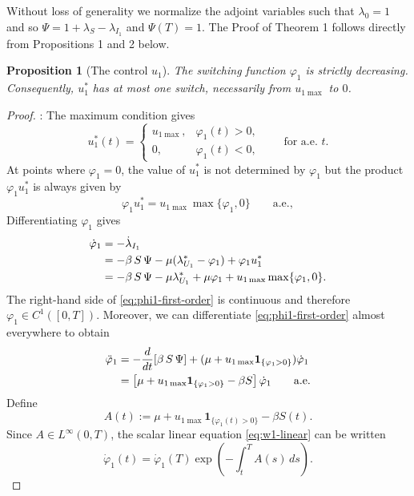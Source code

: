 \documentclass[pdflatex]{sn-jnl}
\newtheorem{proposition}{Proposition}
\theoremstyle{thmstyleone}%
\theoremstyle{thmstyletwo}%
\theoremstyle{thmstylethree}%
\begin{document}
Without loss of generality we normalize the adjoint variables such that $\lambda_0=1$ and so $\Psi=1+\lambda_S-\lambda_{I_1}$ and $\Psi(T)=1$. The Proof of Theorem 1 follows directly from Propositions 1 and 2 below.
%
\begin{proposition}[The control $u_1$]
\label{prop:u1-one-switch}
The switching function \(\varphi_1\) is strictly decreasing. Consequently,
\(u_1^*\) has at most one switch, necessarily from \(u_{1\max}\) to \(0\).
\end{proposition}
%
\begin{proof}:
The maximum condition gives
\[
u_1^*(t)
=
\begin{cases}
u_{1\max}, & \varphi_1(t)>0,\\
0, & \varphi_1(t)<0,
\end{cases}
\qquad\text{for a.e. }t.
\]
At points where \(\varphi_1=0\), the value of \(u_1^*\) is not determined by \(\varphi_1\) but the product \(\varphi_1u_1^*\) is always given by \begin{equation}
\label{eq:phi1-u1-product}
\varphi_1u_1^*
=
u_{1\max}\max\{\varphi_1,0\}
\qquad\text{a.e.},
\end{equation}
Differentiating $\varphi_1$ gives
\begin{align}
\dot\varphi_1
&=
-\dot\lambda_{I_1}\notag\\
&=
-\beta\, S\, \Psi-\mu(\lambda_{U_1}^*-\varphi_1)+\varphi_1u_1^*\notag\\
&=
-\beta\, S\, \Psi-\mu \lambda_{U_1}^*+\mu\varphi_1
+u_{1\max}\max\{\varphi_1,0\}.
\label{eq:phi1-first-order}
\end{align}
The right-hand side of \eqref{eq:phi1-first-order} is continuous and therefore \(\varphi_1\in C^1([0,T])\). Moreover, we can differentiate \eqref{eq:phi1-first-order} almost everywhere to obtain
\begin{align}
\ddot \varphi_1
&=
-\frac{d}{dt}[\beta\, S\, \Psi]+(\mu+u_{1\max}\mathbf{1}_{\{\varphi_1>0\}})\dot \varphi_1\notag\\
&=
\left[
\mu
+u_{1\max}\mathbf 1_{\{\varphi_1>0\}}
-\beta S
\right]\dot \varphi_1
\qquad\text{a.e.}
\label{eq:w1-linear}
\end{align}
Define
\[
A(t)
:=
\mu
+u_{1\max}\mathbf 1_{\{\varphi_1(t)>0\}}
-\beta S(t).
\]
Since \(A\in L^\infty(0,T)\), the scalar linear equation
\eqref{eq:w1-linear} can be written
\begin{equation}
\label{eq:w1-representation}
\dot \varphi_1(t)
=
\dot \varphi_1(T)
\exp\left(
-\int_t^T A(s)\,ds
\right).
\end{equation}

\end{proof}
\end{document}
